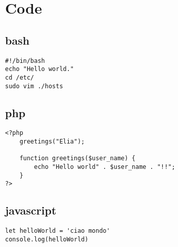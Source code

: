 \section{Code}

\subsection{bash}

\begin{verbatim}
#!/bin/bash
echo "Hello world."
cd /etc/
sudo vim ./hosts
\end{verbatim}

\subsection{php}

\begin{verbatim}
<?php
    greetings("Elia");

    function greetings($user_name) {
        echo "Hello world" . $user_name . "!!";
    }
?>
\end{verbatim}

\subsection{javascript}

\begin{verbatim}
let helloWorld = 'ciao mondo'
console.log(helloWorld)
\end{verbatim}

\clearpage
